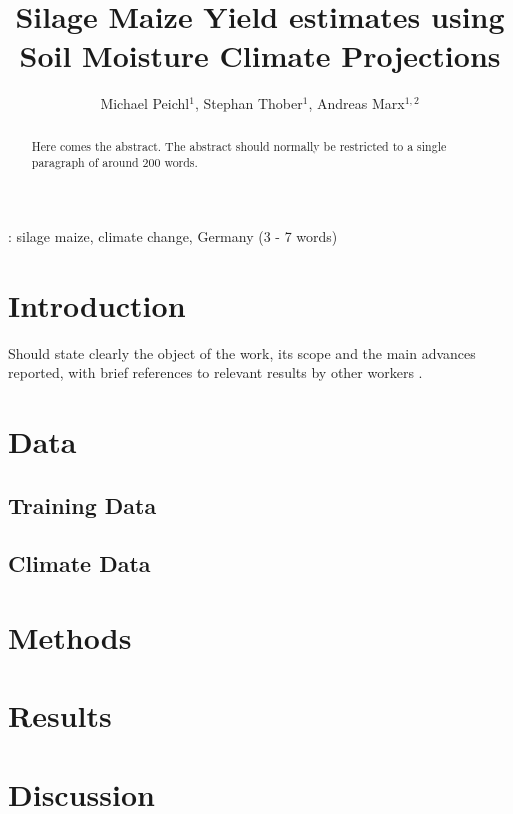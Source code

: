 \documentclass[12pt]{iopart}
\begin{document}
	
\title[Silage Maize Yield estimates using Soil Moisture Climate Projections]{Silage Maize Yield estimates using Soil Moisture Climate Projections}
\author{Michael Peichl$^1$, Stephan Thober$^1$, Andreas Marx$^{1,2}$}

\address{$^1$ Department Computational Hydrosystems, Helmholtz Centre for Environmental Research - UFZ, Permoserstrasse 15, D-04318 Leipzig, Germany}
\address{$^2$ Climate Office for Central Germany, Helmholtz Centre for Environmental Research - UFZ, Permoserstrasse 15, D-04318 Leipzig, Germany}

\begin{abstract}
	Here comes the abstract. The abstract should normally be restricted to a single paragraph of around 200 words.
	
	
	
\end{abstract}

: silage maize, climate change, Germany (3 - 7 words)


\submitto{\ERL}
\maketitle


\section{Introduction}
Should state clearly the object of the work, its scope and the main advances reported, with brief references to relevant
results by other workers   \citep{Brouwer2012, Schlenker2009}.

\section{Data}
\subsection{Training Data}
\subsection{Climate Data}
\section{Methods}
\section{Results}
\section{Discussion}
\newcommand{\newblock}{}

%
\end{document}
